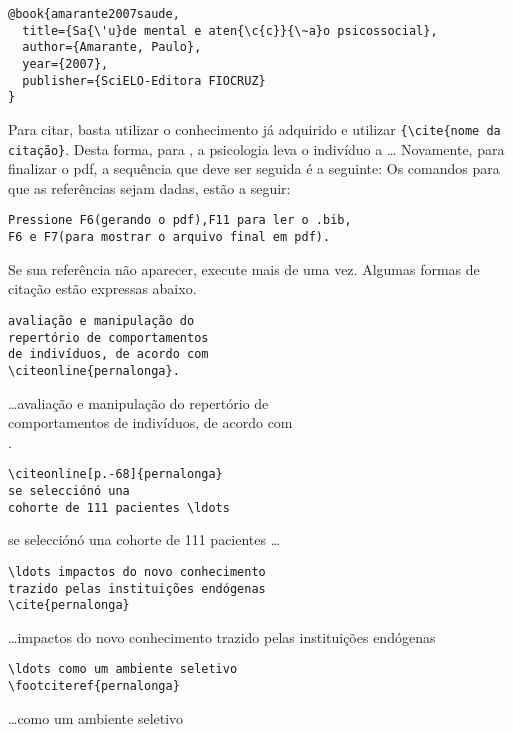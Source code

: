 \begin{verbatim}
@book{amarante2007saude,
  title={Sa{\'u}de mental e aten{\c{c}}{\~a}o psicossocial},
  author={Amarante, Paulo},
  year={2007},
  publisher={SciELO-Editora FIOCRUZ}
}
\end{verbatim}
Para citar, basta utilizar o conhecimento já adquirido e utilizar \verb|{\cite{nome da citação}|.
Desta forma, para , a psicologia leva o indivíduo a \ldots
Novamente, para finalizar o pdf, a sequência que deve ser seguida é a seguinte:
Os comandos para que as referências sejam dadas, estão a seguir:
\begin{verbatim}
Pressione F6(gerando o pdf),F11 para ler o .bib, 
F6 e F7(para mostrar o arquivo final em pdf).
\end{verbatim}
Se sua referência não aparecer, execute mais de uma vez.
Algumas formas de citação estão expressas abaixo.
\begin{multicols}{2}
\footnotesize
\begin{verbatim}
avaliação e manipulação do
repertório de comportamentos
de indivíduos, de acordo com
\citeonline{pernalonga}.
\end{verbatim}
\ldots avaliação e manipulação do repertório de\\
comportamentos de indivíduos, de acordo com\\
.
\end{multicols}

\begin{multicols}{2}
\footnotesize
\begin{verbatim}
\citeonline[p.-68]{pernalonga}
se selecciónó una 
cohorte de 111 pacientes \ldots
\end{verbatim}
se selecciónó una 
cohorte de 111 pacientes \ldots
\end{multicols}

\begin{multicols}{2}
\footnotesize
\begin{verbatim}
\ldots impactos do novo conhecimento 
trazido pelas instituições endógenas 
\cite{pernalonga}
\end{verbatim}
\ldots impactos do novo conhecimento 
trazido pelas instituições endógenas 
\cite{pernalonga}
\end{multicols}

\begin{multicols}{2}
\footnotesize
\begin{verbatim}
\ldots como um ambiente seletivo
\footciteref{pernalonga}
\end{verbatim}
\ldots como um ambiente seletivo
\end{multicols}